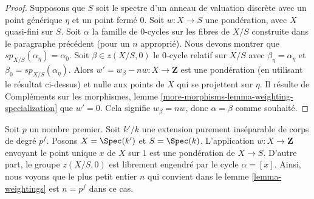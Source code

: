 \begin{proof}
\medskip\noindent
 Supposons que  $S$  soit le spectre d'un anneau de valuation discrète avec un point 
générique  $\eta$  et un point fermé  $0$. Soit  $w : X \to S$ une pondération, avec  
$X$  quasi-fini sur  $S$. Soit  $\alpha$  la famille de  $0$-cycles sur les
 fibres de  $X/S$  construite dans le paragraphe précédent (pour un  $n$ 
approprié). Nous devons montrer que $sp_{X/S}(\alpha_\eta) = \alpha_0$. 
Soit  $\beta \in z(X/S, 0)$  le  $0$-cycle relatif sur  $X/S$
 avec  $\beta_\eta = \alpha_\eta$  et  $\beta_0 = sp_{X/S}(\alpha_\eta)$. 
Alors  $w' = w_\beta - nw : X \to \mathbf{Z}$
  est une pondération (en utilisant le résultat ci-dessus) et nulle aux points de  $X$
  qui se projettent sur  $\eta$. Il résulte de Compléments sur les morphismes,
 lemme \ref{more-morphisms-lemma-weighting-specialization} 
que  $w' = 0$. Cela signifie  $w_\beta = nw$, donc  $\alpha = \beta$  comme souhaité. 
\end{proof} 

\begin{example} 
\label{example-n-must-be-positive-sometimes} 
Soit  $p$  un nombre premier. Soit  $k'/k$  une extension purement inséparable
 de corps de degré  $p^f$. Posons  $X = \Spec(k')$  et  $S = \Spec(k)$. 
L'application  $w : X \to \mathbf{Z}$  envoyant le point unique  $x$  de  $X$ sur  $1$
  est une pondération de  $X \to S$. D'autre part, 
le groupe $z(X/S, 0)$  est librement engendré par le cycle  $\alpha = [x]$.
 Ainsi, nous voyons que le plus petit entier  $n$  qui convient dans 
le lemme \ref{lemma-weightings} est  $n = p^f$  dans ce cas. 
\end{example} 


